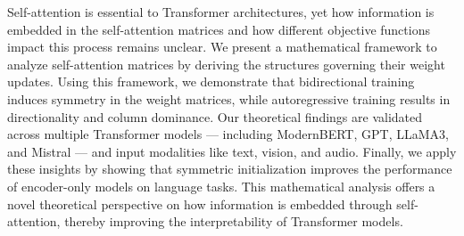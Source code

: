 
%
%
%
%
%
%
%
Self-attention is essential to Transformer architectures, yet how information is embedded in the self-attention matrices and how different objective functions impact this process remains unclear.
%
We present a mathematical framework to analyze self-attention matrices by deriving the structures governing their weight updates.
%
Using this framework, we demonstrate that bidirectional training induces symmetry in the weight matrices, while autoregressive training results in directionality and column dominance.
%
Our theoretical findings are validated across multiple Transformer models — including ModernBERT, GPT, LLaMA3, and Mistral — and input modalities like text, vision, and audio.
%
Finally, we apply these insights by showing that symmetric initialization improves the performance of encoder-only models on language tasks.
%
This mathematical analysis offers a novel theoretical perspective on how information is embedded through self-attention, thereby improving the interpretability of Transformer models.
%

%
%
%
%
%
%